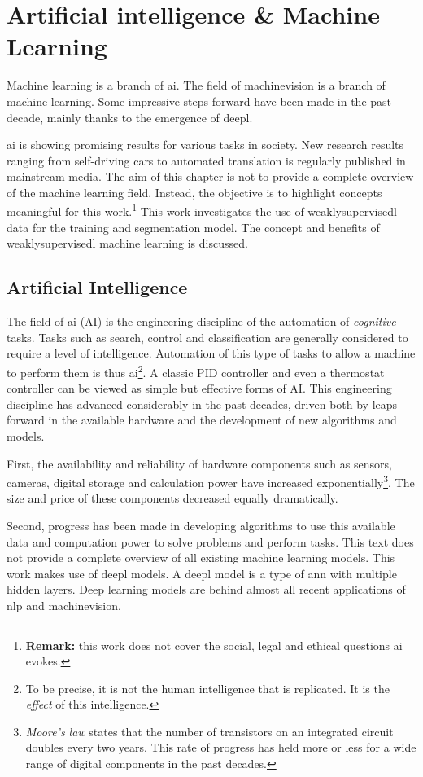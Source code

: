 \chapter{Artificial intelligence \& Machine Learning\label{sec:ai_and_ml}}
\par{
    Machine learning is a branch of \Gls{ai}. 
    The field of \Gls{machinevision} is a branch of machine learning.
    Some impressive steps forward have been made in the past decade, mainly thanks to the emergence of \Gls{deepl}.
}
\par{
    \Gls{ai} is showing promising results for various tasks in society.
    New research results ranging from self-driving cars to automated translation is regularly published in mainstream media.
    The aim of this chapter is not to provide a complete overview of the machine learning field.
    Instead, the objective is to highlight concepts meaningful for this work.\footnote{
        \textbf{Remark:} this work does not cover the social, legal and ethical questions \Gls{ai} evokes.
    }
    This work investigates the use of \Gls{weaklysupervisedl} data for the training and segmentation model. 
    The concept and benefits of \Gls{weaklysupervisedl} machine learning is discussed.
}

\section{Artificial Intelligence}
\par{
    The field of \Gls{ai} (AI) is the engineering discipline of the automation of \textit{cognitive} tasks.
    Tasks such as search, control and classification are generally considered to require a level of intelligence. 
    Automation of this type of tasks to allow a machine to perform them is thus \Gls{ai}\footnote{To be precise, it is not the human intelligence that is replicated. It is the \textit{effect} of this intelligence.}.
    A classic PID controller and even a thermostat controller can be viewed as simple but effective forms of AI.
    This engineering discipline has advanced considerably in the past decades, driven both by leaps forward in the available hardware and the development of new algorithms and models. 
}
\par{
    First, the availability and reliability of hardware components such as sensors, cameras, digital storage and calculation power have increased exponentially\footnote{ \textit{Moore's law} states that the number of transistors on an integrated circuit doubles every two years. This rate of progress has held more or less for a wide range of digital components in the past decades.}.
    The size and price of these components decreased equally dramatically. }
\par{
    Second, progress has been made in developing algorithms to use this available data and computation power to solve problems and perform tasks.
    This text does not provide a complete overview of all existing machine learning models. 
    This work makes use of \Gls{deepl} models.
    A \Gls{deepl} model is a type of \acrfull{ann} with multiple hidden layers. 
    Deep learning models are behind almost all recent applications of \acrfull{nlp} and \Gls{machinevision}.
}

